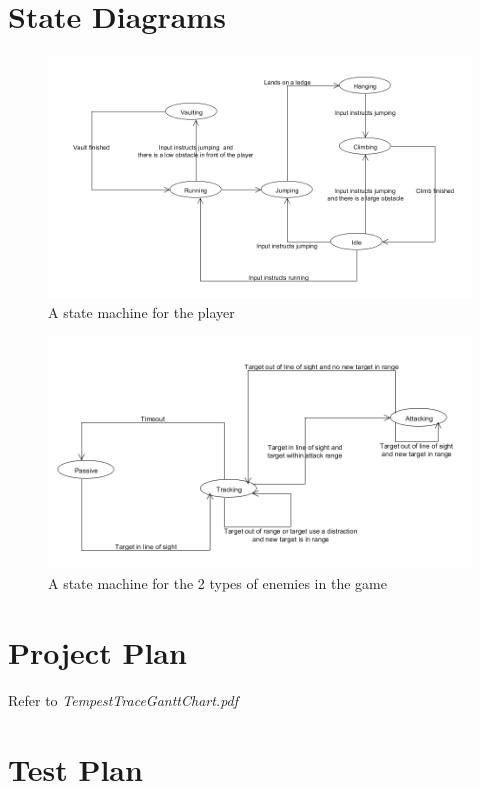 \documentclass[a4paper,10pt]{article}
\begin{document}
\section{State Diagrams}
\begin{figure}[H]
	\begin{center}
		\includegraphics[scale=0.5]{images/PlayerStateMachine.png}
		\caption{A state machine for the player}
	\end{center}
\end{figure}
\begin{figure}[H]
	\begin{center}
		\includegraphics[scale=0.5]{images/EnemyStateMachine.png}
		\caption{A state machine for the 2 types of enemies in the game}
	\end{center}
\end{figure}

\section{Project Plan}
Refer to \textit{TempestTraceGanttChart.pdf}
\section{Test Plan}
\end{document}
